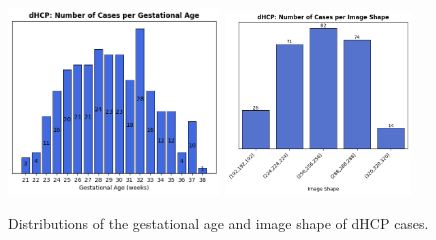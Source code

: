 \begin{figure}[htbp]
    \centering
    \includegraphics[width=0.5\textwidth]{figures/dHCP_GA.png} \quad
    \includegraphics[width=0.44\textwidth]{figures/dHCP_image_shape.png}
    \caption{Distributions of the gestational age and image shape of dHCP cases.}
    \label{fig:dhcp_plots}
\end{figure}
